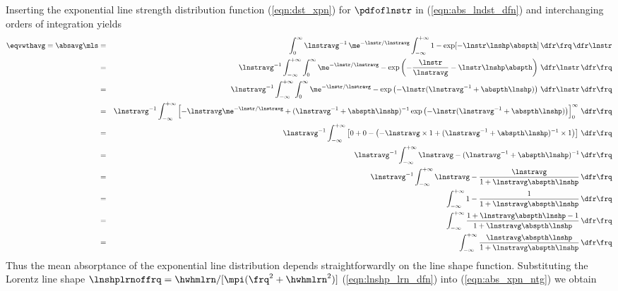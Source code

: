 \documentclass[12pt]{article}
\begin{document}
Inserting the exponential line strength distribution function
(\ref{eqn:dst_xpn}) for  $\pdfoflnstr$ in (\ref{eqn:abs_lndst_dfn}) 
and interchanging orders of integration yields
\begin{eqnarray}
\eqvwthavg = \absavg \mls 
& = & 
\int_{0}^{\infty} \lnstravg^{-1} \, \me^{-\lnstr/\lnstravg}
\int_{-\infty}^{+\infty} 
1 - \exp[ - \lnstr \lnshp \abspth ]
\,\dfr\frq 
\,\dfr\lnstr 
\nonumber \\
& = & 
\lnstravg^{-1} 
\int_{-\infty}^{+\infty} 
\int_{0}^{\infty} \me^{-\lnstr/\lnstravg}
 - \exp \left( -\frac{\lnstr}{\lnstravg} - \lnstr \lnshp \abspth
\right) 
\,\dfr\lnstr 
\,\dfr\frq 
\nonumber \\
& = & 
\lnstravg^{-1} 
\int_{-\infty}^{+\infty} 
\int_{0}^{\infty} \me^{-\lnstr/\lnstravg}
 - \exp \left( -\lnstr ( \lnstravg^{-1} + \abspth \lnshp ) \right) 
\,\dfr\lnstr 
\,\dfr\frq 
\nonumber \\
& = & 
\lnstravg^{-1} 
\int_{-\infty}^{+\infty} 
\left[ -\lnstravg \me^{-\lnstr/\lnstravg}
+ ( \lnstravg^{-1} + \abspth \lnshp )^{-1}
\exp \left( -\lnstr ( \lnstravg^{-1} + \abspth \lnshp ) \right) 
\right]_{0}^{\infty}
\,\dfr\frq 
\nonumber \\
& = & 
\lnstravg^{-1} 
\int_{-\infty}^{+\infty} 
\left[ 0 + 0 - \left(-\lnstravg \times 1 + 
( \lnstravg^{-1} + \abspth \lnshp )^{-1} \times 1 \right) \right]
\,\dfr\frq 
\nonumber \\
& = & 
\lnstravg^{-1} 
\int_{-\infty}^{+\infty} 
\lnstravg - ( \lnstravg^{-1} + \abspth \lnshp )^{-1}
\,\dfr\frq 
\nonumber \\
& = & 
\lnstravg^{-1} 
\int_{-\infty}^{+\infty} 
\lnstravg - \frac{\lnstravg}{1 + \lnstravg \abspth \lnshp}
\,\dfr\frq 
\nonumber \\
& = & 
\int_{-\infty}^{+\infty} 
1 - \frac{1}{1 + \lnstravg \abspth \lnshp}
\,\dfr\frq 
\nonumber \\
& = & 
\int_{-\infty}^{+\infty} 
\frac{1 + \lnstravg \abspth \lnshp - 1}{1 + \lnstravg \abspth \lnshp}
\,\dfr\frq 
\nonumber \\
& = & 
\int_{-\infty}^{+\infty} 
\frac{\lnstravg \abspth \lnshp}{1 + \lnstravg \abspth \lnshp}
\,\dfr\frq 
\label{eqn:abs_xpn_ntg}
\end{eqnarray}
Thus the mean absorptance of the exponential line distribution 
depends straightforwardly on the line shape function.
Substituting the Lorentz line shape 
$\lnshplrnoffrq = \hwhmlrn/[\mpi ( \frq^{2} + \hwhmlrn^{2} ) ]$
(\ref{eqn:lnshp_lrn_dfn}) into (\ref{eqn:abs_xpn_ntg}) we obtain
\end{document}
